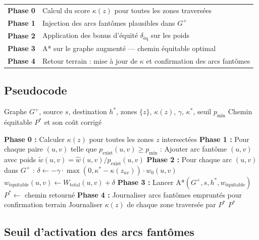 \documentclass[12pt,a4paper]{article}
\theoremstyle{definition}
\theoremstyle{remark}
\begin{document}
\medskip
\noindent
\begin{tabular}{cl}
  \textbf{Phase 0} & Calcul du score $\kappa(z)$ pour toutes les zones traversées \\
  \textbf{Phase 1} & Injection des arcs fantômes plausibles dans $G^+$ \\
  \textbf{Phase 2} & Application des bonus d'équité $\delta_\text{éq}$ sur les poids \\
  \textbf{Phase 3} & A* sur le graphe augmenté --- chemin équitable optimal \\
  \textbf{Phase 4} & Retour terrain : mise à jour de $\kappa$ et confirmation des arcs fantômes \\
\end{tabular}

\subsection{Pseudocode}

\begin{algorithm}[H]
\caption{A* Équitable avec arcs fantômes (Twist 8)}
\begin{algorithmic}[1]
\Require Graphe $G^+$, source $s$, destination $h^*$, zones $\{z\}$,
         $\kappa(z)$, $\gamma$, $\kappa^*$, seuil $p_{\min}$
\Ensure Chemin équitable $P^*$ et son coût corrigé

\State \textbf{Phase 0 :} Calculer $\kappa(z)$ pour toutes les zones $z$ intersectées
\State \textbf{Phase 1 :} Pour chaque paire $(u,v)$ telle que $p_\text{exist}(u,v) \geq p_{\min}$ :
\State \hspace{2em} Ajouter arc fantôme $(u,v)$ avec poids $\tilde{w}(u,v) = \hat{w}(u,v) / p_\text{exist}(u,v)$
\State \textbf{Phase 2 :} Pour chaque arc $(u,v)$ dans $G^+$ :
\State \hspace{2em} $\delta \leftarrow -\gamma \cdot \max(0, \kappa^* - \kappa(z_{uv})) \cdot w_0(u,v)$
\State \hspace{2em} $w_\text{équitable}(u,v) \leftarrow W_\text{total}(u,v) + \delta$
\State \textbf{Phase 3 :} Lancer A*$(G^+, s, h^*, w_\text{équitable})$
\State $P^* \leftarrow$ chemin retourné
\State \textbf{Phase 4 :} Journaliser arcs fantômes empruntés pour confirmation terrain
\State Journaliser $\kappa(z)$ de chaque zone traversée par $P^*$
\State \Return $P^*$
\end{algorithmic}
\end{algorithm}

\subsection{Seuil d'activation des arcs fantômes}
\end{document}
